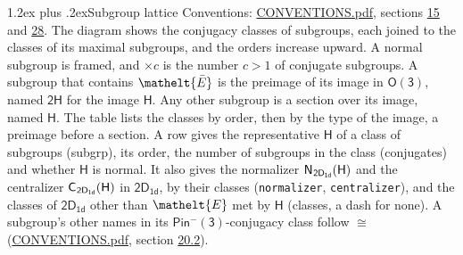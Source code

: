 \documentclass[10pt,a4paper]{article}
\makeatletter
\renewcommand\section{\@startsection{section}{1}{\z@}{-3ex plus -1ex minus -.2ex}%
  {1.2ex plus .2ex}{\normalfont\large\sffamily\bfseries\color{parttitle}}}
\numberwithin{equation}{section}
\newcommand{\eltfont}[1]{{\let\sigma\eltsigma\mathelt{#1}}}
\newcommand{\grp}[1]{\mathsf{#1}}
\newcommand{\cls}[1]{\eltfont{#1}}
\newcommand{\elt}[1]{\eltfont{#1}}
\newcommand{\samecls}{\cong}
\newcommand{\barred}[1]{\bar{#1}}
\newcommand{\secondclass}{\mathrm{b}}
\newcommand{\hairsp}{\mkern1mu}
\makeatother
\begin{document}
\section{Subgroup lattice}\label{s:subgroups}
Conventions: \href{../../CONVENTIONS.pdf}{CONVENTIONS.pdf}, sections \href{../../../rotation/CONVENTIONS.pdf\#conv.15}{15} and \href{../../CONVENTIONS.pdf\#conv.28}{28}.
The diagram shows the conjugacy classes of subgroups, each joined to the classes of its maximal subgroups, and the orders increase upward. \label{n:index.conjugates.c}A normal subgroup is framed, and ${\times}c$ is the number $c > 1$ of conjugate subgroups. \label{n:group.H}A subgroup that contains $\elt{\barred{E}}$ is the preimage of its image in $\grp{O(3)}$, named $\grp{2H}$ for the image $\grp{H}$. Any other subgroup is a section over its image, named $\grp{H}$. The table lists the classes by order, then by the type of the image, a preimage before a section. \label{n:head.subgroup}\label{n:head.order}\label{n:head.conjugates}\label{n:head.normal}A row gives the representative $\grp{H}$ of a class of subgroups (subgrp), its order, the number of subgroups in the class (conjugates) and whether $\grp{H}$ is normal. \label{n:group.normalizer}\label{n:group.centralizer}\label{n:head.classes}It also gives the normalizer $\grp{N}_{\hairsp \grp{2D_{1d}}}(\grp{H})$ and the centralizer $\grp{C}_{\hairsp \grp{2D_{1d}}}(\grp{H})$ in $\grp{2D_{1d}}$, by their classes (\texttt{normalizer}, \texttt{centralizer}), and the classes of $\grp{2D_{1d}}$ other than $\cls{E}$ met by $\grp{H}$ (classes, a dash for none). A subgroup's other names in its \href{Pinminus3.pdf}{$\grp{Pin^{-}(3)}$}-conjugacy class follow $\samecls$ (\href{../../CONVENTIONS.pdf}{CONVENTIONS.pdf}, section \href{../../CONVENTIONS.pdf\#conv.20.2}{20.2}).
\begin{center}
\end{center}
\end{document}
